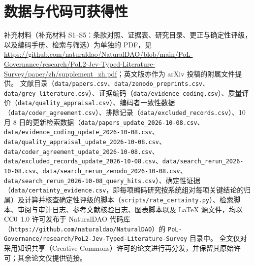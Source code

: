 \section*{数据与代码可获得性}
补充材料（补充材料 S1--S5：条款对照、证据表、研究目录、更正与确定性评级，以及编码手册、检索与筛选）为单独的 PDF，见 \url{https://github.com/naturaldao/NaturalDAO/blob/main/PoL-Governance/research/PoL2-Jev-Typed-Literature-Survey/paper/zh/supplement_zh.pdf}；英文版亦作为 arXiv 投稿的附属文件提供。
文献目录（\nolinkurl{data/papers.csv}、\nolinkurl{data/zenodo_preprints.csv}、\nolinkurl{data/grey_literature.csv}）、证据编码（\nolinkurl{data/evidence_coding.csv}）、质量评价（\nolinkurl{data/quality_appraisal.csv}）、编码者一致性数据（\nolinkurl{data/coder_agreement.csv}）、排除记录（\nolinkurl{data/excluded_records.csv}）、10 月 8 日的更新检索数据（\nolinkurl{data/papers_update_2026-10-08.csv}、\nolinkurl{data/evidence_coding_update_2026-10-08.csv}、\nolinkurl{data/quality_appraisal_update_2026-10-08.csv}、\nolinkurl{data/coder_agreement_update_2026-10-08.csv}、\nolinkurl{data/excluded_records_update_2026-10-08.csv}、\nolinkurl{data/search_rerun_2026-10-08.csv}、\nolinkurl{data/search_rerun_zenodo_2026-10-08.csv}、\nolinkurl{data/search_rerun_2026-10-08_query_hits.csv}）、确定性证据（\nolinkurl{data/certainty_evidence.csv}，即每项编码研究按系统组对每项关键结论的归属）及计算并核查确定性评级的脚本（\nolinkurl{scripts/rate_certainty.py}）、检索脚本、审阅与审计日志、参考文献核验日志、图表脚本以及 LaTeX 源文件，均以 CC0~1.0 许可发布于 NaturalDAO 代码库（\nolinkurl{https://github.com/naturaldao/NaturalDAO}）的 \nolinkurl{PoL-Governance/research/PoL2-Jev-Typed-Literature-Survey} 目录中。
全文仅对采用知识共享（Creative Commons）许可的论文进行再分发，并保留其原始许可；其余论文仅提供链接。
